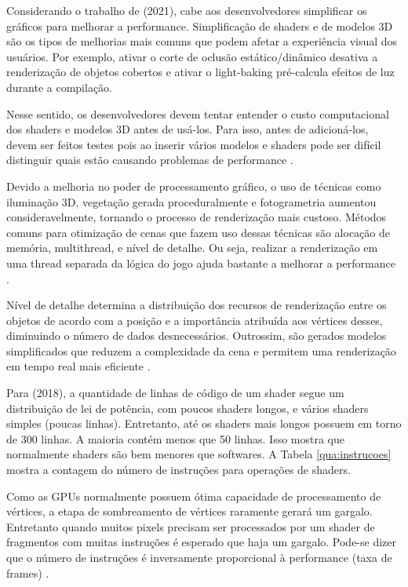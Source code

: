 Considerando o trabalho de  (2021), cabe aos desenvolvedores simplificar os gráficos para melhorar a performance. Simplificação de shaders e de modelos 3D são os tipos de melhorias mais comuns que podem afetar a experiência visual dos usuários. Por exemplo, ativar o corte de oclusão estático/dinâmico desativa a renderização de objetos cobertos e ativar o \Gls{light-baking} pré-calcula efeitos de luz durante a compilação.

Nesse sentido, os desenvolvedores devem tentar entender o custo computacional dos shaders e modelos 3D antes de usá-los. Para isso, antes de adicioná-los, devem ser feitos testes pois ao inserir vários modelos e shaders pode ser difícil distinguir quais estão causando problemas de performance \cite{nusrat2021commit}.

Devido a melhoria no poder de processamento gráfico, o uso de técnicas como iluminação 3D, vegetação gerada proceduralmente e fotogrametria aumentou consideravelmente, tornando o processo de renderização mais custoso. Métodos comuns para otimização de cenas que fazem uso dessas técnicas são alocação de memória, \Gls{multithread}, e nível de detalhe. Ou seja, realizar a renderização em uma thread separada da lógica do jogo ajuda bastante a melhorar a performance \cite{zhang2017vegetation}.

Nível de detalhe determina a distribuição dos recursos de renderização entre os objetos de acordo com a posição e a importância atribuída aos vértices desses, diminuindo o número de dados desnecessários. Outrossim, são gerados modelos simplificados que reduzem a complexidade da cena e permitem uma renderização em tempo real mais eficiente \cite{zhang2017vegetation}.

Para  (2018), a quantidade de linhas de código de um shader segue um distribuição de lei de potência, com poucos shaders longos, e vários shaders simples (poucas linhas). Entretanto, até os shaders mais longos possuem em torno de 300 linhas. A maioria contém menos que 50 linhas. Isso mostra que normalmente shaders são bem menores que softwares. A Tabela \ref{qua:instrucoes} mostra a contagem do número de instruções para operações de shaders.



Como as GPUs normalmente possuem ótima capacidade de processamento de vértices, a etapa de sombreamento de vértices raramente gerará um gargalo. Entretanto quando muitos pixels precisam ser processados por um shader de fragmentos com muitas instruções é esperado que haja um gargalo. Pode-se dizer que o número de instruções é inversamente proporcional à performance (taxa de frames) \cite{optimizationMobile}.

